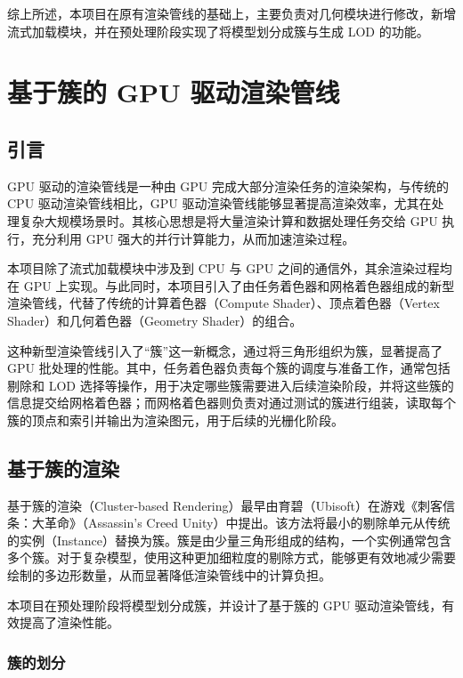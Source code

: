 \par 综上所述，本项目在原有渲染管线的基础上，主要负责对几何模块进行修改，新增流式加载模块，并在预处理阶段实现了将模型划分成簇与生成 LOD 的功能。

\clearpage

\section{基于簇的 GPU 驱动渲染管线}

\subsection{引言}

GPU 驱动的渲染管线是一种由 GPU 完成大部分渲染任务的渲染架构，与传统的 CPU 驱动渲染管线相比，GPU 驱动渲染管线能够显著提高渲染效率，尤其在处理复杂大规模场景时。其核心思想是将大量渲染计算和数据处理任务交给 GPU 执行，充分利用 GPU 强大的并行计算能力，从而加速渲染过程。

本项目除了流式加载模块中涉及到 CPU 与 GPU 之间的通信外，其余渲染过程均在 GPU 上实现。与此同时，本项目引入了由任务着色器和网格着色器组成的新型渲染管线，代替了传统的计算着色器（Compute Shader）、顶点着色器（Vertex Shader）和几何着色器（Geometry Shader）的组合。

这种新型渲染管线引入了“簇”这一新概念，通过将三角形组织为簇，显著提高了 GPU 批处理的性能\cite{Czubala2024}。其中，任务着色器负责每个簇的调度与准备工作，通常包括剔除和 LOD 选择等操作，用于决定哪些簇需要进入后续渲染阶段，并将这些簇的信息提交给网格着色器；而网格着色器则负责对通过测试的簇进行组装，读取每个簇的顶点和索引并输出为渲染图元，用于后续的光栅化阶段。

\subsection{基于簇的渲染}

基于簇的渲染（Cluster-based Rendering）最早由育碧（Ubisoft）在游戏《刺客信条：大革命》（Assassin's Creed Unity）中提出\cite{Ubisoft2015}。该方法将最小的剔除单元从传统的实例（Instance）替换为簇。簇是由少量三角形组成的结构，一个实例通常包含多个簇。对于复杂模型，使用这种更加细粒度的剔除方式，能够更有效地减少需要绘制的多边形数量，从而显著降低渲染管线中的计算负担。

本项目在预处理阶段将模型划分成簇，并设计了基于簇的 GPU 驱动渲染管线，有效提高了渲染性能。

\subsubsection{簇的划分} \label{subsubsec:cluster division}

